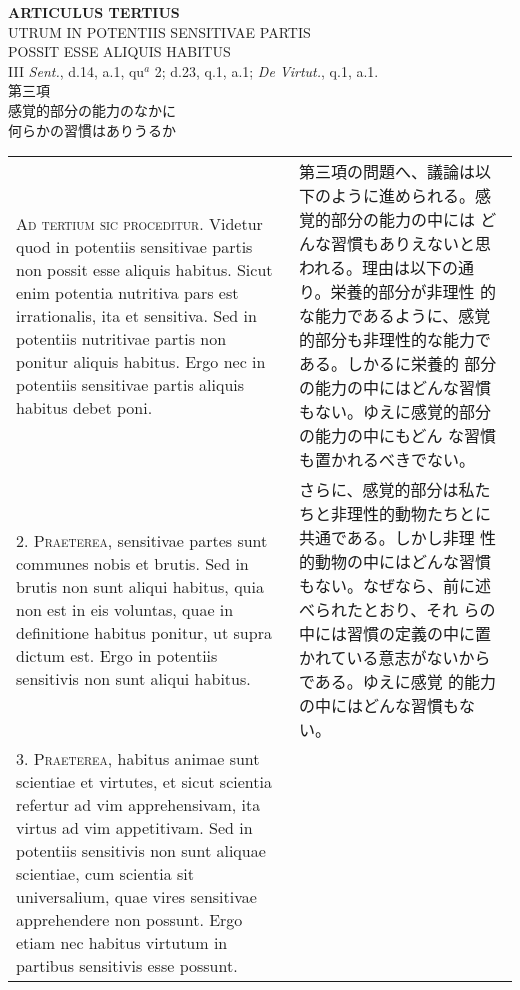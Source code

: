 \documentclass[10pt]{jsarticle} %
\begin{document}
\begin{center}
{\Large {\bf ARTICULUS TERTIUS}}\\
{\large UTRUM IN POTENTIIS SENSITIVAE PARTIS\\POSSIT ESSE ALIQUIS HABITUS}\\
{\footnotesize III {\itshape Sent.}, d.14, a.1, qu$^{a}$ 2; d.23, q.1, a.1; {\itshape De Virtut.}, q.1, a.1.}\\
{\Large 第三項\\感覚的部分の能力のなかに\\何らかの習慣はありうるか}
\end{center}

\begin{longtable}{p{21em}p{21em}}

{\scshape Ad tertium sic proceditur}. Videtur quod in potentiis
 sensitivae partis non possit esse aliquis habitus. Sicut enim
 potentia nutritiva pars est irrationalis, ita et sensitiva. Sed in
 potentiis nutritivae partis non ponitur aliquis habitus. Ergo nec in
 potentiis sensitivae partis aliquis habitus debet poni.

&

第三項の問題へ、議論は以下のように進められる。感覚的部分の能力の中には
どんな習慣もありえないと思われる。理由は以下の通り。栄養的部分が非理性
的な能力であるように、感覚的部分も非理性的な能力である。しかるに栄養的
部分の能力の中にはどんな習慣もない。ゆえに感覚的部分の能力の中にもどん
な習慣も置かれるべきでない。

\\



2. {\scshape Praeterea}, sensitivae partes sunt communes nobis et brutis. Sed in
 brutis non sunt aliqui habitus, quia non est in eis voluntas, quae in
 definitione habitus ponitur, ut supra dictum est. Ergo in potentiis
 sensitivis non sunt aliqui habitus.

&

さらに、感覚的部分は私たちと非理性的動物たちとに共通である。しかし非理
性的動物の中にはどんな習慣もない。なぜなら、前に述べられたとおり、それ
らの中には習慣の定義の中に置かれている意志がないからである。ゆえに感覚
的能力の中にはどんな習慣もない。

\\



3. {\scshape Praeterea}, habitus animae sunt scientiae et virtutes, et
sicut scientia refertur ad vim apprehensivam, ita virtus ad vim
appetitivam. Sed in potentiis sensitivis non sunt aliquae scientiae,
cum scientia sit universalium, quae vires sensitivae apprehendere non
possunt. Ergo etiam nec habitus virtutum in partibus sensitivis esse
possunt.


\end{longtable}
\end{document}
